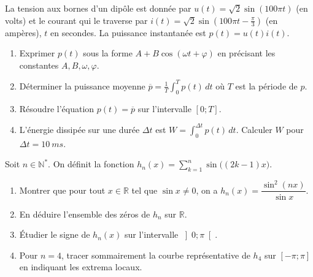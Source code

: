 \documentclass[11pt]{article}
\begin{document}
\begin{exercice}
La tension aux bornes d'un dipôle est donnée par $u(t) = \sqrt{2}\sin(100\pi t)$ (en volts) et le courant qui le traverse par $i(t) = \sqrt{2}\sin\left(100\pi t - \frac{\pi}{3}\right)$ (en ampères), $t$ en secondes.
La puissance instantanée est $p(t) = u(t)i(t)$.
\begin{enumerate}
    \item Exprimer $p(t)$ sous la forme $A + B\cos(\omega t + \varphi)$ en précisant les constantes $A, B, \omega, \varphi$.
    \item Déterminer la puissance moyenne $\overline{p} = \frac{1}{T}\int_0^T p(t)\,dt$ où $T$ est la période de $p$.
    \item Résoudre l'équation $p(t) = \overline{p}$ sur l'intervalle $\left[0 ; T\right]$.
    \item L'énergie dissipée sur une durée $\Delta t$ est $W = \int_0^{\Delta t} p(t)\,dt$. Calculer $W$ pour $\Delta t = \SI{10}{ms}$.
\end{enumerate}
\end{exercice}

\begin{exercice}
Soit $n \in \mathbb{N}^*$. On définit la fonction $h_n(x) = \sum_{k=1}^{n} \sin\bigl((2k-1)x\bigr)$.
\begin{enumerate}
    \item Montrer que pour tout $x \in \mathbb{R}$ tel que $\sin x \neq 0$, on a 
    $h_n(x) = \dfrac{\sin^2(nx)}{\sin x}$.
    \item En déduire l'ensemble des zéros de $h_n$ sur $\mathbb{R}$.
    \item Étudier le signe de $h_n(x)$ sur l'intervalle $\left]0 ; \pi\right[$.
    \item Pour $n=4$, tracer sommairement la courbe représentative de $h_4$ sur $\left[-\pi ; \pi\right]$ en indiquant les extrema locaux.
\end{enumerate}
\end{exercice}
\end{document}
